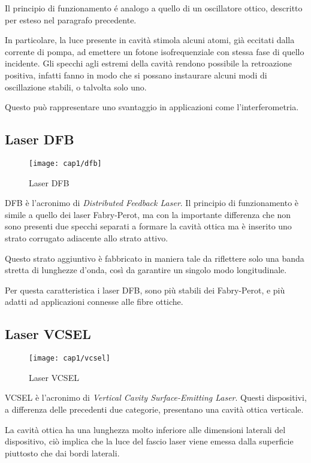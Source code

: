 Il principio di funzionamento é analogo a quello di un oscillatore ottico, descritto per esteso nel paragrafo precedente.

In particolare, la luce presente in cavità stimola alcuni atomi, già eccitati dalla corrente di pompa, ad emettere un fotone isofrequenziale con stessa fase di quello incidente.  
Gli specchi agli estremi della cavità rendono possibile la retroazione positiva, infatti fanno in modo che si possano instaurare alcuni modi di oscillazione stabili, o talvolta solo uno. 

Questo può rappresentare uno svantaggio in applicazioni come l'interferometria.

\subsection{Laser DFB}
\begin{figure}[H]
	\begin{center}
		\texttt{[image: cap1/dfb]}
		\caption{Laser DFB}
		\label{dfb}
	\end{center}
\end{figure}
DFB è l'acronimo di \emph{Distributed Feedback Laser}. Il principio di funzionamento è simile a quello dei laser Fabry-Perot, ma con la importante differenza che non sono presenti due specchi separati a formare la cavità ottica ma è inserito uno strato corrugato adiacente allo strato attivo.

Questo strato aggiuntivo è fabbricato in maniera tale da riflettere solo una banda stretta di lunghezze d'onda, così da garantire un singolo modo longitudinale. 

Per questa caratteristica i laser DFB, sono più stabili dei Fabry-Perot, e più adatti ad applicazioni connesse alle fibre ottiche.

\subsection{Laser VCSEL}
\begin{figure}[H]
  \begin{center}
    \texttt{[image: cap1/vcsel]}
    \caption{Laser VCSEL}
    \label{vcsel}
  \end{center}
\end{figure}
VCSEL è l'acronimo di \emph{Vertical Cavity Surface-Emitting Laser}. Questi dispositivi, a differenza delle precedenti due categorie, presentano una cavità ottica verticale. 

La cavità ottica ha una lunghezza molto inferiore alle dimensioni laterali del dispositivo, ciò implica che la luce del fascio laser viene emessa dalla superficie piuttosto che dai bordi laterali. 

